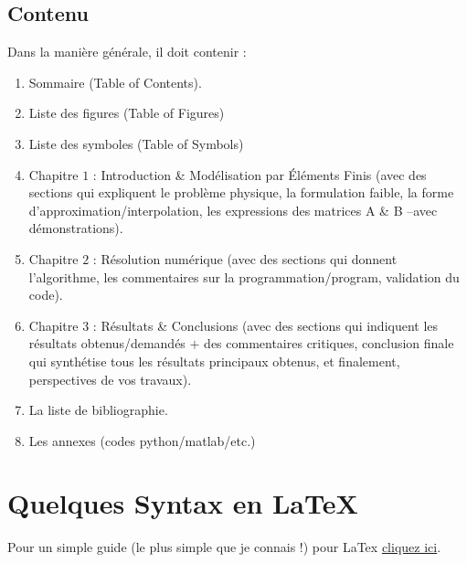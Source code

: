\documentclass[a4paper,10pt]{report} %
\begin{document}
\section{Contenu} %
\label{sec:contenu}
Dans la manière générale, il doit contenir :
\begin{enumerate} %
	\item Sommaire (Table of Contents).
	\item Liste des figures (Table of Figures)
	\item Liste des symboles (Table of Symbols)
    \item Chapitre $1$ : Introduction \& Modélisation par Éléments Finis (avec des sections qui expliquent le problème physique, la formulation faible, la forme d'approximation/interpolation, les expressions des matrices A \& B --avec démonstrations).
    \item Chapitre $2$ : Résolution numérique (avec des sections qui donnent l'algorithme, les commentaires sur la programmation/program, validation du code).    
    \item Chapitre $3$ : Résultats \& Conclusions (avec des sections qui indiquent les résultats obtenus/demandés $+$ des commentaires critiques, conclusion finale qui synthétise tous les résultats principaux obtenus, et finalement, perspectives de vos travaux).
    \item La liste de bibliographie.
    \item Les annexes (codes python/matlab/etc.)
\end{enumerate} 














\chapter{Quelques Syntax en LaTeX} %
Pour un simple guide (le plus simple que je connais !) pour LaTex \href{http://www.howtotex.com/download/FiveMinuteGuideToLaTeX.pdf}{cliquez ici}.
\end{document}
